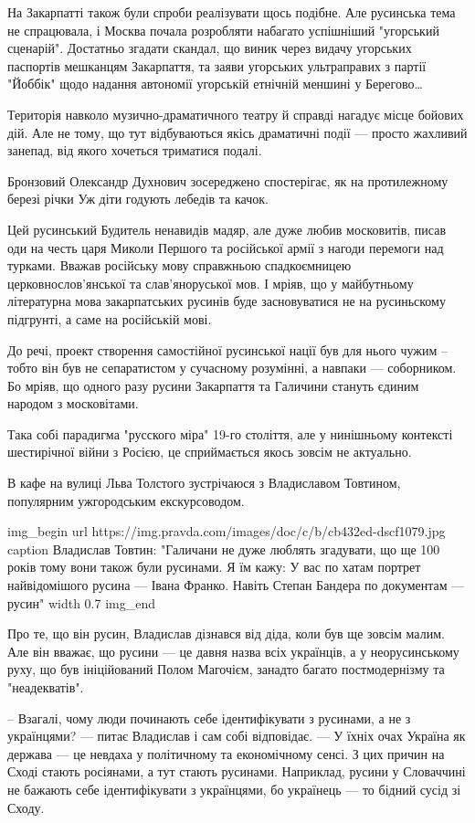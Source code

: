 На Закарпатті також були спроби реалізувати щось подібне. Але русинська тема не
спрацювала, і Москва почала розробляти набагато успішніший "угорський
сценарій". Достатньо згадати скандал, що виник через видачу угорських паспортів
мешканцям Закарпаття, та заяви угорських ультраправих з партії "Йоббік" щодо
надання автономії угорській етнічній меншині у Берегово…

Територія навколо музично-драматичного театру й справді нагадує місце бойових
дій. Але не тому, що тут відбуваються якісь драматичні події --- просто жахливий
занепад, від якого хочеться триматися подалі.

Бронзовий Олександр Духнович зосереджено спостерігає, як на протилежному березі
річки Уж діти годують лебедів та качок.

Цей русинський Будитель ненавидів мадяр, але дуже любив московитів, писав оди
на честь царя Миколи Першого та російської армії з нагоди перемоги над турками.
Вважав російську мову справжньою спадкоємницею церковнослов’янської та
слав’яноруської мов. І мріяв, що у майбутньому літературна мова закарпатських
русинів буде засновуватися не на русиньскому підгрунті, а саме на російській
мові.

До речі, проект створення самостійної русинської нації був для нього чужим –
тобто він був не сепаратистом у сучасному розумінні, а навпаки --- соборником. Бо
мріяв, що одного разу русини Закарпаття та Галичини стануть єдиним народом з
московітами.

Така собі парадигма "русского міра" 19-го століття, але у нинішньому контексті
шестирічної війни з Росією, це сприймається якось зовсім не актуально.

В кафе на вулиці Льва Толстого зустрічаюся з Владиславом Товтином, популярним
ужгородським екскурсоводом.

\ifcmt
img_begin 
    url https://img.pravda.com/images/doc/c/b/cb432ed-dscf1079.jpg
    caption Владислав Товтин: "Галичани не дуже люблять згадувати, що ще 100 років тому вони також були русинами. Я їм кажу: У вас по хатам портрет найвідомішого русина --- Івана Франко. Навіть Степан Бандера по документам --- русин"
        width 0.7
img_end
\fi

Про те, що він русин, Владислав дізнався від діда, коли був ще зовсім малим.
Але він вважає, що русини --- це давня назва всіх українців, а у неорусинському
руху, що був ініційований Полом Магочієм, занадто багато постмодернізму та
"неадекватів".

– Взагалі, чому люди починають себе ідентифікувати з русинами, а не з
українцями? --- питає Владислав і сам собі відповідає. --- У їхніх очах Україна як
держава --- це невдаха у політичному та економічному сенсі. З цих причин на Сході
стають росіянами, а тут стають русинами. Наприклад, русини у Словаччині не
бажають себе ідентифікувати з українцями, бо українець --- то бідний сусід зі
Сходу.

